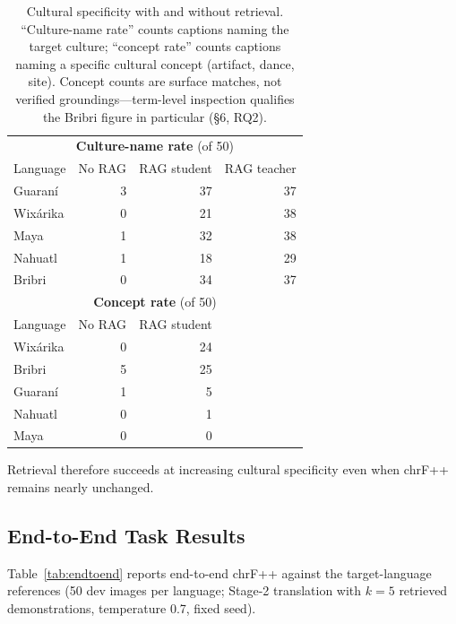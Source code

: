 \documentclass[11pt]{article}
\begin{document}
\begin{table}[t]
\centering
\small
\begin{tabular}{lrrr}
\toprule
\multicolumn{4}{c}{\textbf{Culture-name rate} (of 50)} \\
Language & No RAG & RAG student & RAG teacher \\
\midrule
Guaraní   & 3 & 37 & 37 \\
Wixárika  & 0 & 21 & 38 \\
Maya      & 1 & 32 & 38 \\
Nahuatl   & 1 & 18 & 29 \\
Bribri    & 0 & 34 & 37 \\
\midrule
\multicolumn{4}{c}{\textbf{Concept rate} (of 50)} \\
Language & No RAG & RAG student & \\
\midrule
Wixárika  & 0 & 24 & \\
Bribri    & 5 & 25 & \\
Guaraní   & 1 & 5  & \\
Nahuatl   & 0 & 1  & \\
Maya      & 0 & 0  & \\
\bottomrule
\end{tabular}
\caption{Cultural specificity with and without retrieval. ``Culture-name
rate'' counts captions naming the target culture; ``concept rate'' counts
captions naming a specific cultural concept (artifact, dance, site). Concept
counts are surface matches, not verified groundings---term-level inspection
qualifies the Bribri figure in particular (\S6, RQ2).}
\label{tab:rates}
\end{table}

Retrieval therefore succeeds at increasing cultural specificity even when
chrF++ remains nearly unchanged.

\subsection{End-to-End Task Results}
Table~\ref{tab:endtoend} reports end-to-end chrF++ against the target-language
references (50 dev images per language; Stage-2 translation with $k{=}5$
retrieved demonstrations, temperature 0.7, fixed seed).
\end{document}
